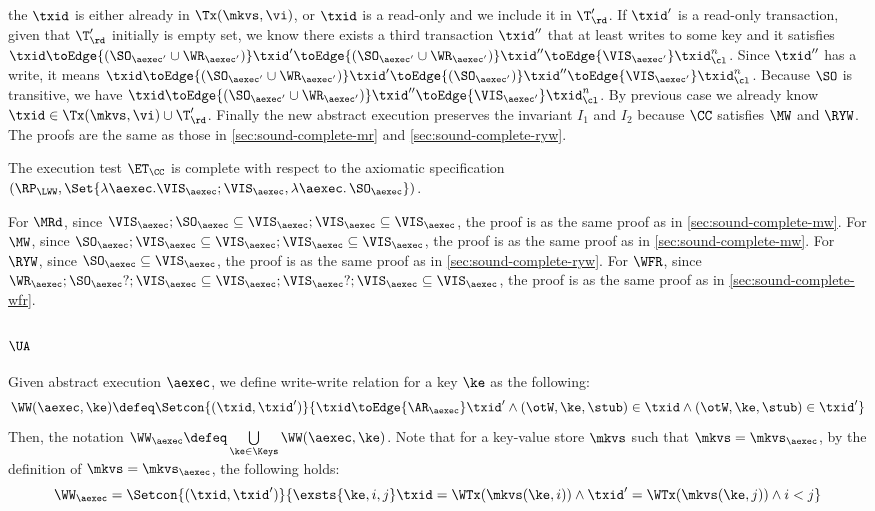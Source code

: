 the \( \txid \) is either already in \( \Tx(\mkvs, \vi) \), 
or \( \txid \) is a read-only and we include it in \( \T'_\rd \).
If \( \txid' \) is a read-only transaction,
given that \( \T'_\rd \) initially is empty set,
we know there exists a third transaction \( \txid'' \) that at least writes to some key
and it satisfies \( \txid \toEdge{( \SO_{\aexec'} \cup \WR_{\aexec'} )}  \txid' \toEdge{( \SO_{\aexec'} \cup \WR_{\aexec'} )}  \txid'' \toEdge{\VIS_{\aexec'}} \txid_\cl^n \).
Since \( \txid'' \) has a write, it means 
\( \txid \toEdge{( \SO_{\aexec'} \cup \WR_{\aexec'} )}  \txid' \toEdge{( \SO_{\aexec'} )}  \txid'' \toEdge{\VIS_{\aexec'}} \txid_\cl^n \).
Because \( \SO \) is transitive, we have \( \txid \toEdge{( \SO_{\aexec'} \cup \WR_{\aexec'} )} \txid'' \toEdge{\VIS_{\aexec'}} \txid_\cl^n \).
By previous case we already know \( \txid \in \Tx(\mkvs, \vi) \cup \T'_\rd \).
Finally the new abstract execution preserves the invariant \( I_1 \) and \( I_2 \) 
because  \( \CC \) satisfies \( \MW \) and \( \RYW \).
The proofs are the same as those in \cref{sec:sound-complete-mr} and \cref{sec:sound-complete-ryw}.

The execution test $\ET_\CC$ is complete with respect to the axiomatic specification 
\( (\RP_{\LWW}, \Set{\lambda \aexec. \VIS_{\aexec} ; \VIS_{\aexec}, \lambda \aexec \ldotp \SO_\aexec })\).

For \( \MRd \), since \(  \VIS_\aexec ; \SO_\aexec \subseteq  \VIS_\aexec ; \VIS_{\aexec} \subseteq \VIS_\aexec \),
the proof is as the same proof as in \cref{sec:sound-complete-mw}.
For \( \MW \), since \( \SO_\aexec ; \VIS_\aexec \subseteq  \VIS_\aexec ; \VIS_{\aexec} \subseteq \VIS_\aexec \),
the proof is as the same proof as in \cref{sec:sound-complete-mw}.
For \( \RYW \), since \( \SO_\aexec \subseteq \VIS_\aexec \),
the proof is as the same proof as in \cref{sec:sound-complete-ryw}.
For \( \WFR \), since \( \WR_\aexec ; \SO_\aexec? ; \VIS_\aexec \subseteq \VIS_\aexec ; \VIS_{\aexec}? ; \VIS_\aexec \subseteq \VIS_\aexec \),
the proof is as the same proof as in \cref{sec:sound-complete-wfr}.


\subsubsection{\( \UA \)}
\label{sec:sound-complete-ua}

Given abstract execution \( \aexec \), we define write-write relation for a key \( \ke \) as the following:
\[ 
    \WW(\aexec,\ke) \defeq \Setcon{(\txid, \txid')}{\txid \toEdge{\AR_\aexec} \txid' \land (\otW,\ke, \stub ) \in \txid \land (\otW,\ke, \stub ) \in \txid'  } 
\]
Then, the notation \( \WW_\aexec \defeq \bigcup\limits_{\ke \in \Keys} \WW(\aexec, \ke) \).
Note that for a key-value store \( \mkvs \) such that \( \mkvs = \mkvs_\aexec \),
by the definition of  \(  \mkvs = \mkvs_\aexec \), 
the following holds:
\[
    \WW_\aexec = \Setcon{(\txid, \txid')}{\exsts{\ke, i,j } \txid = \WTx(\mkvs(\ke, i)) \land \txid' = \WTx(\mkvs(\ke, j)) \land i < j}
\]

